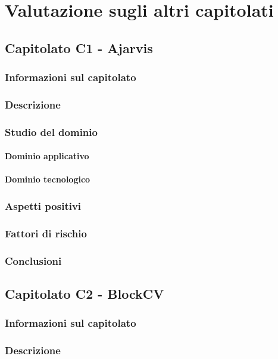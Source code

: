 \section{Valutazione sugli altri capitolati}
	\subsection{Capitolato C1 - Ajarvis}
		\subsubsection{Informazioni sul capitolato}
		\subsubsection{Descrizione}
		\subsubsection{Studio del dominio}
			\paragraph{Dominio applicativo}
			\paragraph{Dominio tecnologico}
		\subsubsection{Aspetti positivi}
		\subsubsection{Fattori di rischio}
		\subsubsection{Conclusioni}
			
			
	\subsection{Capitolato C2 - BlockCV}
		\subsubsection{Informazioni sul capitolato}
		\subsubsection{Descrizione}
